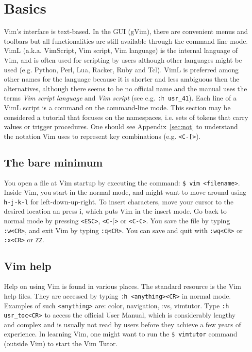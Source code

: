 \documentclass{article}
\newcommand{\ttt}[1] {
	\texttt{<#1>}}
\newcommand{\tttt}[1]{\texttt{#1}}
\begin{document}
\section{Basics}\label{basics}
Vim's interface is text-based.
In the GUI (gVim),
there are convenient menus and toolbars
but all functionalities are still available through
the command-line mode.
VimL (a.k.a. VimScript, Vim script, Vim language)
is the internal language of Vim,
and is often used for scripting by users
although other languages might be used 
(e.g. Python, Perl, Lua, Racker, Ruby and Tcl). 
VimL is preferred among other names for the language
because it is shorter and less ambiguous then the alternatives,
although there seems to be no official name and the manual
uses the terms \emph{Vim script language} and \emph{Vim script}
(see e.g. \tttt{:h usr\_41}).
Each line of a VimL script is a command on the
command-line mode.
This section may be considered a tutorial
that focuses on the namespaces, i.e. sets of tokens
that carry values or trigger procedures.
One should see Appendix~\ref{sec:not}
to understand the notation Vim uses to represent key combinations
(e.g. \ttt{C-[}).

\subsection{The bare minimum}\label{minimum}
You open a file at Vim startup by executing
the command: \texttt{\$ vim <filename>}.
Inside Vim, you start in the normal
mode, and might want to move around using
\texttt{h-j-k-l} for left-down-up-right.
To insert characters, move your
cursor to the desired location an press i,
which puts Vim in the insert mode.
Go back to normal mode by pressing
\texttt{<ESC>}, \ttt{C-$[$} or \texttt{<C-C>}.
You save the file by typing \texttt{:w<CR>},
and exit Vim by typing \texttt{:q<CR>}.
You can save and quit with \tttt{:wq<CR>}
or \tttt{:x<CR>} or \tttt{ZZ}.

\subsection{Vim help}
Help on using Vim is found in various places.
The standard resource is the Vim help files.
They are accessed by typing \texttt{:h <anything><CR>}
in normal mode.
Examples of such \texttt{<anything>} are:
color, navigation, :vs, vimtutor.
Type 
\texttt{:h usr\_toc<CR>}
to access the official User Manual,
which is considerably lengthy and complex
and is usually not read by users before they achieve a few years
of experience.
In learning Vim, one
might want to run the \texttt{\$ vimtutor} command
(outside Vim) to start the Vim Tutor.
\end{document}
